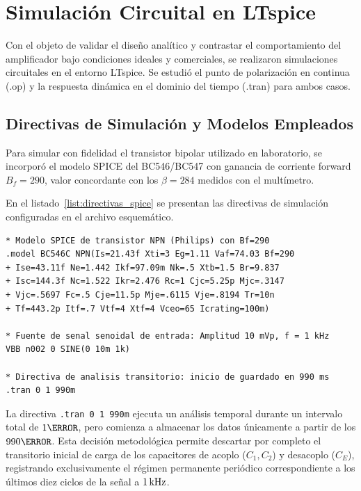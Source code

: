 \chapter{Simulación Circuital en LTspice}
\label{chap:simulacion}

Con el objeto de validar el diseño analítico y contrastar el comportamiento del amplificador bajo condiciones ideales
y comerciales, se realizaron simulaciones circuitales en el entorno LTspice. Se estudió el punto de polarización en
continua (.op) y la respuesta dinámica en el dominio del tiempo (.tran) para ambos casos.

\section{Directivas de Simulación y Modelos Empleados}

Para simular con fidelidad el transistor bipolar utilizado en laboratorio, se incorporó el modelo SPICE del BC546/BC547
con ganancia de corriente forward $B_f = 290$, valor concordante con los $\beta = 284$ medidos con el multímetro.

En el listado~\ref{list:directivas_spice} se presentan las directivas de simulación configuradas en el archivo esquemático.

\begin{lstlisting}[style=ltspice, caption={Directivas de simulación y modelo de transistor en LTspice.}, label={list:directivas_spice}]
* Modelo SPICE de transistor NPN (Philips) con Bf=290
.model BC546C NPN(Is=21.43f Xti=3 Eg=1.11 Vaf=74.03 Bf=290
+ Ise=43.11f Ne=1.442 Ikf=97.09m Nk=.5 Xtb=1.5 Br=9.837
+ Isc=144.3f Nc=1.522 Ikr=2.476 Rc=1 Cjc=5.25p Mjc=.3147
+ Vjc=.5697 Fc=.5 Cje=11.5p Mje=.6115 Vje=.8194 Tr=10n
+ Tf=443.2p Itf=.7 Vtf=4 Xtf=4 Vceo=65 Icrating=100m)

* Fuente de senal senoidal de entrada: Amplitud 10 mVp, f = 1 kHz
VBB n002 0 SINE(0 10m 1k)

* Directiva de analisis transitorio: inicio de guardado en 990 ms
.tran 0 1 990m
\end{lstlisting}

La directiva \lstinline[style=ltspice]{.tran 0 1 990m} ejecuta un análisis temporal durante un intervalo total de $1\s$,
pero comienza a almacenar los datos únicamente a partir de los $990\ms$. Esta decisión metodológica permite descartar
por completo el transitorio inicial de carga de los capacitores de acoplo ($C_1, C_2$) y desacoplo ($C_E$), registrando
exclusivamente el régimen permanente periódico correspondiente a los últimos diez ciclos de la señal a $1\,\mathrm{kHz}$.


